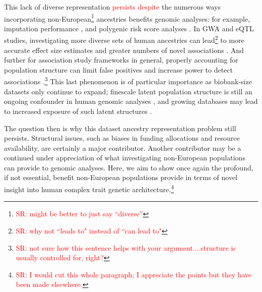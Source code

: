 \documentclass[12pt,a4paper]{article}
\newcommand{\red}[1]{\textcolor{red}{#1}}
\begin{document}
This lack of diverse representation \red{persists despite} the numerous ways incorporating non-European\footnote{\red{SR: might be better to just say ``diverse''}} ancestries benefits genomic analyses: for example, imputation performance \citep{Huang2009,Howie2011,Das2018,Kowalski2019}, and polygenic risk score analyses \citep{Martin2017a,Duncan2019,Kerminen2019,Rosenberg2019,Marnetto2020,Mostafavi2020}. In GWA and eQTL studies, investigating more diverse sets of human ancestries can lead\footnote{\red{SR: why not ``leads to" instead of ``can lead to"}} to more accurate effect size estimates and greater numbers of novel associations \citep{Dumitrescu2011,Stranger2012,Carlson2013,Bien2019,Mogil2018,Gurdasani2019,Kuchenbaecker2019,Wojcik2019,Zhong2019}. And further for association study frameworks in general, properly accounting for population structure can limit false positives and increase power to detect associations \citep{Kang2010,Price2010,Zhou2012,Sul2018}.\footnote{\red{SR: not sure how this sentence helps with your argument....structure is usually controlled for, right?}} This last phenomenon is of particular importance as biobank-size datasets only continue to expand; finescale latent population structure is still an ongoing confounder in human genomic analyses \citep{Berg2019,Sohail2019,Lawson2020}, and growing databases may lead to increased exposure of such latent structures \citep{Haworth2019,Dai2020,Sakaue2020,Lawson2020}. 

The question then is why this dataset ancestry representation problem still persists. Structural issues, such as biases in funding allocations and resource availability, are certainly a major contributor. Another contributor may be a continued under appreciation of what investigating non-European populations can provide to genomic analyses. Here, we aim to show once again the profound, if not essential, benefit non-European populations provide in terms of novel insight into human complex trait genetic architecture.\footnote{\red{SR: I would cut this whole paragraph; I appreciate the points but they have been made elsewhere.}}
\end{document}
